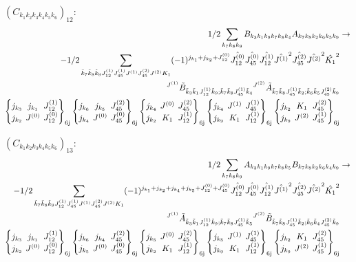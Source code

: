 \documentclass[11pt]{article}
\newcommand{\sixj}[6]{\begingroup\setlength{\arraycolsep}{0.2em}\begin{Bmatrix} #1 & #2 & #3 \\ #4 & #5 & #6 \end{Bmatrix}_{\text{6j}}\endgroup}
\begin{document}
$\left({C}_{{k}_{1}{k}_{2}{k}_{3}{k}_{4}{k}_{5}{k}_{6}}\right)_{12}$:
\begin{align}
1/2\sum_{{k}_{7}{k}_{8}{k}_{9}}{B}_{{k}_{3}{k}_{1}{k}_{9}{k}_{7}{k}_{8}{k}_{4}}{A}_{{k}_{7}{k}_{8}{k}_{2}{k}_{6}{k}_{5}{k}_{9}}&\rightarrow \notag \\-1/2\sum_{\tilde{k}_{7}\tilde{k}_{8}\tilde{k}_{9}J^{(1)}_{12}J^{(1)}_{45}J^{(1)}J^{(2)}_{45}J^{(2)}K_{1}}(-1)^{j_{{k}_{1}} +j_{{k}_{2}} +J^{(0)}_{12} }\hat{J^{(0)}_{12}}\hat{J^{(0)}_{45}}\hat{J^{(1)}_{12}}\hat{J^{(1)}}^{2}\hat{J^{(2)}_{45}}\hat{J^{(2)}}^{2}\hat{K_{1}}^{2}& \notag \\{}^{J^{(1)}}\tilde{B}_{\tilde{k}_{3}\tilde{k}_{1}J^{(1)}_{12}\tilde{k}_{9};\tilde{k}_{7}\tilde{k}_{8}J^{(1)}_{45}\tilde{k}_{4}}{}^{J^{(2)}}\tilde{A}_{\tilde{k}_{7}\tilde{k}_{8}J^{(1)}_{45}\tilde{k}_{2};\tilde{k}_{6}\tilde{k}_{5}J^{(2)}_{45}\tilde{k}_{9}}& \notag \\\sixj{j_{{k}_{3}}}{j_{{k}_{1}}}{J^{(1)}_{12}}{j_{{k}_{2}}}{J^{(0)}}{J^{(0)}_{12}}\sixj{j_{{k}_{6}}}{j_{{k}_{5}}}{J^{(2)}_{45}}{j_{{k}_{4}}}{J^{(0)}}{J^{(0)}_{45}}\sixj{j_{{k}_{4}}}{J^{(0)}}{J^{(2)}_{45}}{j_{{k}_{2}}}{K_{1}}{J^{(1)}_{12}}\sixj{j_{{k}_{4}}}{J^{(1)}}{J^{(1)}_{45}}{j_{{k}_{9}}}{K_{1}}{J^{(1)}_{12}}\sixj{j_{{k}_{2}}}{K_{1}}{J^{(2)}_{45}}{j_{{k}_{9}}}{J^{(2)}}{J^{(1)}_{45}}
\end{align}

$\left({C}_{{k}_{1}{k}_{2}{k}_{3}{k}_{4}{k}_{5}{k}_{6}}\right)_{13}$:
\begin{align}
1/2\sum_{{k}_{7}{k}_{8}{k}_{9}}{A}_{{k}_{3}{k}_{1}{k}_{9}{k}_{7}{k}_{8}{k}_{5}}{B}_{{k}_{7}{k}_{8}{k}_{2}{k}_{6}{k}_{4}{k}_{9}}&\rightarrow \notag \\-1/2\sum_{\tilde{k}_{7}\tilde{k}_{8}\tilde{k}_{9}J^{(1)}_{12}J^{(1)}_{45}J^{(1)}J^{(2)}_{45}J^{(2)}K_{1}}(-1)^{j_{{k}_{1}} +j_{{k}_{2}} +j_{{k}_{4}} +j_{{k}_{5}} +J^{(0)}_{12} +J^{(0)}_{45} }\hat{J^{(0)}_{12}}\hat{J^{(0)}_{45}}\hat{J^{(1)}_{12}}\hat{J^{(1)}}^{2}\hat{J^{(2)}_{45}}\hat{J^{(2)}}^{2}\hat{K_{1}}^{2}& \notag \\{}^{J^{(1)}}\tilde{A}_{\tilde{k}_{3}\tilde{k}_{1}J^{(1)}_{12}\tilde{k}_{9};\tilde{k}_{7}\tilde{k}_{8}J^{(1)}_{45}\tilde{k}_{5}}{}^{J^{(2)}}\tilde{B}_{\tilde{k}_{7}\tilde{k}_{8}J^{(1)}_{45}\tilde{k}_{2};\tilde{k}_{6}\tilde{k}_{4}J^{(2)}_{45}\tilde{k}_{9}}& \notag \\\sixj{j_{{k}_{3}}}{j_{{k}_{1}}}{J^{(1)}_{12}}{j_{{k}_{2}}}{J^{(0)}}{J^{(0)}_{12}}\sixj{j_{{k}_{6}}}{j_{{k}_{4}}}{J^{(2)}_{45}}{j_{{k}_{5}}}{J^{(0)}}{J^{(0)}_{45}}\sixj{j_{{k}_{5}}}{J^{(0)}}{J^{(2)}_{45}}{j_{{k}_{2}}}{K_{1}}{J^{(1)}_{12}}\sixj{j_{{k}_{5}}}{J^{(1)}}{J^{(1)}_{45}}{j_{{k}_{9}}}{K_{1}}{J^{(1)}_{12}}\sixj{j_{{k}_{2}}}{K_{1}}{J^{(2)}_{45}}{j_{{k}_{9}}}{J^{(2)}}{J^{(1)}_{45}}
\end{align}
\end{document}
